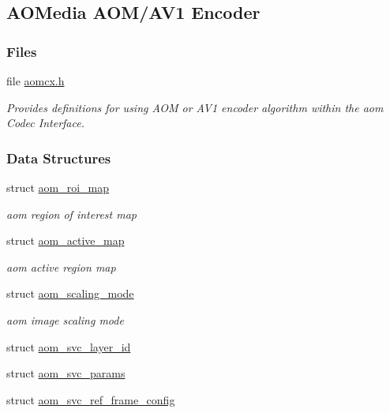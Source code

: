 \hypertarget{group__aom__encoder}{}\subsection{A\+O\+Media A\+O\+M/\+A\+V1 Encoder}
\label{group__aom__encoder}
\subsubsection*{Files}
\begin{DoxyCompactItemize}
\item 
file \hyperlink{aomcx_8h}{aomcx.\+h}
\begin{DoxyCompactList}\small\item\em Provides definitions for using A\+OM or A\+V1 encoder algorithm within the aom Codec Interface. \end{DoxyCompactList}\end{DoxyCompactItemize}
\subsubsection*{Data Structures}
\begin{DoxyCompactItemize}
\item 
struct \hyperlink{structaom__roi__map}{aom\+\_\+roi\+\_\+map}
\begin{DoxyCompactList}\small\item\em aom region of interest map \end{DoxyCompactList}\item 
struct \hyperlink{structaom__active__map}{aom\+\_\+active\+\_\+map}
\begin{DoxyCompactList}\small\item\em aom active region map \end{DoxyCompactList}\item 
struct \hyperlink{structaom__scaling__mode}{aom\+\_\+scaling\+\_\+mode}
\begin{DoxyCompactList}\small\item\em aom image scaling mode \end{DoxyCompactList}\item 
struct \hyperlink{structaom__svc__layer__id}{aom\+\_\+svc\+\_\+layer\+\_\+id}
\item 
struct \hyperlink{structaom__svc__params}{aom\+\_\+svc\+\_\+params}
\item 
struct \hyperlink{structaom__svc__ref__frame__config}{aom\+\_\+svc\+\_\+ref\+\_\+frame\+\_\+config}
\end{DoxyCompactItemize}
